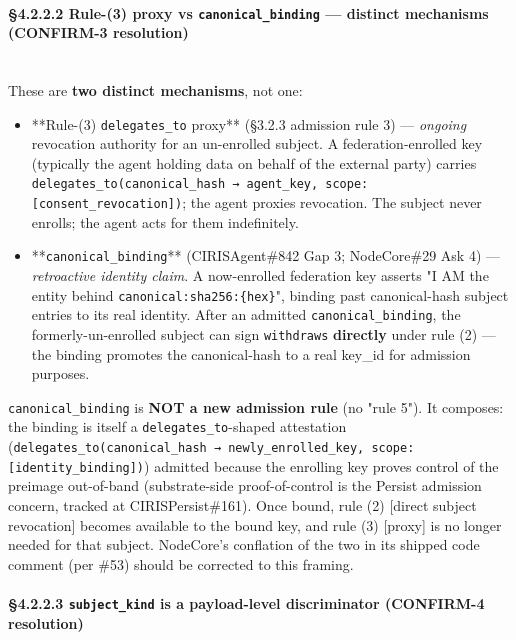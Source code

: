 \documentclass[10pt]{article}
\begin{document}
\paragraph{§4.2.2.2 Rule-(3) proxy vs \texttt{canonical\_binding} — distinct mechanisms (CONFIRM-3 resolution)}\mbox{}\\


These are \textbf{two distinct mechanisms}, not one:


\begin{itemize}\setlength\itemsep{0pt}
\item **Rule-(3) \texttt{delegates\_to} proxy** (§3.2.3 admission rule 3) — \textit{ongoing} revocation authority for an un-enrolled subject. A federation-enrolled key (typically the agent holding data on behalf of the external party) carries \texttt{delegates\_to(canonical\_hash → agent\_key, scope: [consent\_revocation])}; the agent proxies revocation. The subject never enrolls; the agent acts for them indefinitely.
\item **\texttt{canonical\_binding}** (CIRISAgent\#842 Gap 3; NodeCore\#29 Ask 4) — \textit{retroactive identity claim}. A now-enrolled federation key asserts "I AM the entity behind \texttt{canonical:sha256:\{hex\}}", binding past canonical-hash subject entries to its real identity. After an admitted \texttt{canonical\_binding}, the formerly-un-enrolled subject can sign \texttt{withdraws} \textbf{directly} under rule (2) — the binding promotes the canonical-hash to a real key\_id for admission purposes.
\end{itemize}


\texttt{canonical\_binding} is \textbf{NOT a new admission rule} (no "rule 5"). It composes: the binding is itself a \texttt{delegates\_to}-shaped attestation (\texttt{delegates\_to(canonical\_hash → newly\_enrolled\_key, scope: [identity\_binding])}) admitted because the enrolling key proves control of the preimage out-of-band (substrate-side proof-of-control is the Persist admission concern, tracked at CIRISPersist\#161). Once bound, rule (2) [direct subject revocation] becomes available to the bound key, and rule (3) [proxy] is no longer needed for that subject. NodeCore's conflation of the two in its shipped code comment (per \#53) should be corrected to this framing.


\paragraph{§4.2.2.3 \texttt{subject\_kind} is a payload-level discriminator (CONFIRM-4 resolution)}\mbox{}\\
\end{document}
